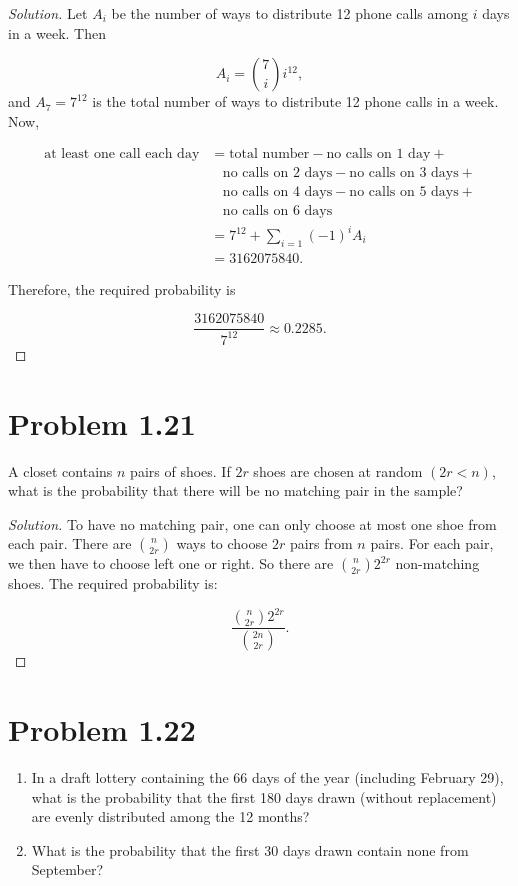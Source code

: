 \documentclass[12pt,letterpaper,reqno]{amsart}
\numberwithin{equation}{subsection}
\begin{document}
\begin{proof}[Solution]
Let $A_i$ be the number of ways to distribute 12 phone calls among $i$ days in a week. Then

\[ A_i = \binom{7}{i} i^{12}, \]
and $A_7 = 7^{12}$ is the total number of ways to distribute 12 phone calls in a week. Now,

\begin{align*}
    \mbox{at least one call each day} &= \mbox{total number} - \mbox{no calls on 1 day} + \\
    & \ \ \ \ \mbox{no calls on 2 days} - \mbox{no calls on 3 days} + \\
    & \ \ \ \ \mbox{no calls on 4 days} - \mbox{no calls on 5 days} + \\
    & \ \ \ \ \mbox{no calls on 6 days} \\
    &= 7^{12} + \sum_{i=1} (-1)^i A_i \\
    &= 3162075840.
\end{align*}

Therefore, the required probability is

\[ \frac{3162075840}{7^{12}} \approx 0.2285. \]
\end{proof}

\newpage
\section{Problem 1.21}
A closet contains $n$ pairs of shoes. If $2r$ shoes are chosen at random $(2r < n)$, what is the probability that there will be no matching pair in the sample?

\begin{proof}[Solution]
To have no matching pair, one can only choose at most one shoe from each pair. There are $\binom{n}{2r}$ ways to choose $2r$ pairs from $n$ pairs. For each pair, we then have to choose left one or right. So there are $\binom{n}{2r} 2^{2r}$ non-matching shoes. The required probability is:

\[ \frac{\binom{n}{2r} 2^{2r}}{\binom{2n}{2r}}. \]
\end{proof}

\newpage
\section{Problem 1.22}

\begin{enumerate}[label=(\alph*),leftmargin=*]
    \item In a draft lottery containing the 66 days of the year (including February 29), what is the probability that the first 180 days drawn (without replacement) are evenly distributed among the 12 months?
    \item What is the probability that the first 30 days drawn contain none from September?
\end{enumerate}~\\
\end{document}
